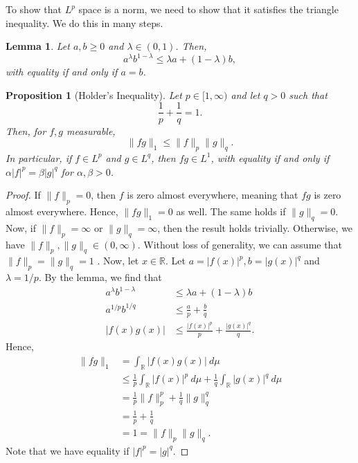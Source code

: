 \documentclass[a4paper, openany]{memoir}
\theoremstyle{definition}
\theoremstyle{plain}
\newtheorem{lemma}[definition]{Lemma}
\newtheorem{proposition}[definition]{Proposition}
\begin{document}
    To show that $L^p$ space is a norm, we need to show that it satisfies the triangle inequality. We do this in many steps.
    \begin{lemma}
        Let $a, b \geq 0$ and $\lambda \in (0, 1)$. Then,
        \[a^\lambda b^{1 - \lambda} \leq \lambda a + (1 - \lambda) b,\]
        with equality if and only if $a = b$.
    \end{lemma}
    \begin{proposition}[Holder's Inequality]
        Let $p \in [1, \infty)$ and let $q > 0$ such that 
        \[\frac{1}{p} + \frac{1}{q} = 1.\]
        Then, for $f, g$ measurable,
        \[\lVert f g \rVert_1 \leq \lVert f \rVert_p \lVert g \rVert_q.\]
        In particular, if $f \in L^p$ and $g \in L^q$, then $fg \in L^1$, with equality if and only if $\alpha |f|^p = \beta |g|^q$ for $\alpha, \beta > 0$.
    \end{proposition}
    \begin{proof}
        If $\lVert f \rVert_p = 0$, then $f$ is zero almost everywhere, meaning that $fg$ is zero almost everywhere. Hence, $\lVert fg \rVert_1 = 0$ as well. The same holds if $\lVert g \rVert_q = 0$. Now, if $\lVert f \rVert_p = \infty$ or $\lVert g \rVert_q = \infty$, then the result holds trivially. Otherwise, we have $\lVert f \rVert_p, \lVert g \rVert_q \in (0, \infty)$. Without loss of generality, we can assume that $\lVert f \rVert_p = \lVert g \rVert_q = 1$ . Now, let $x \in \mathbb{R}$. Let $a = |f(x)|^p, b = |g(x)|^q$ and $\lambda = 1/p$. By the lemma, we find that
        \begin{align*}
            a^\lambda b^{1 - \lambda} &\leq \lambda a + (1 - \lambda) b \\
            a^{1/p} b^{1/q} &\leq \frac{a}{p} + \frac{b}{q} \\
            |f(x) g(x)| &\leq \frac{|f(x)|^p}{p} + \frac{|g(x)|^q}{q}.
        \end{align*}
        Hence,
        \begin{align*}
            \lVert f g \rVert_1 &= \int_{\mathbb{R}} |f(x) g(x)| \ d\mu \\
            &\leq \frac{1}{p} \int_{\mathbb{R}} |f(x)|^p \ d\mu + \frac{1}{q} \int_{\mathbb{R}} |g(x)|^q \ d\mu \\
            &= \frac{1}{p} \lVert f \rVert_p^p + \frac{1}{q} \lVert g \rVert_q^q \\
            &= \frac{1}{p} + \frac{1}{q} \\
            &= 1 = \lVert f \rVert_p \lVert g \rVert_q.
        \end{align*}
        Note that we have equality if $|f|^p = |g|^q$.
    \end{proof}
\end{document}
